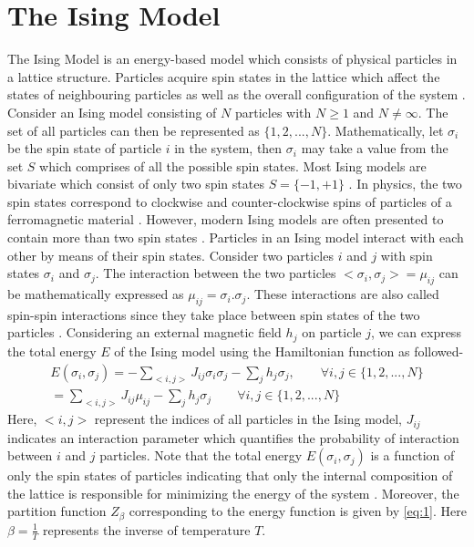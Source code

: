 \documentclass{article}
\begin{document}
\section{The Ising Model}
The Ising Model \cite{intro} is an energy-based model which consists of physical particles in a lattice structure. Particles acquire spin states in the lattice which affect the states of neighbouring particles as well as the overall configuration of the system \cite{spin}. Consider an Ising model consisting of $N$ particles with $N \geq 1$ and $N \neq \infty$. The set of all particles can then be represented as $\{1,2,...,N\}$. Mathematically, let $\sigma_{i}$ be the spin state of particle $i$ in the system, then $\sigma_{i}$ may take a value from the set $S$ which comprises of all the possible spin states. Most Ising models are bivariate which consist of only two spin states $S = \{-1,+1\}$ \cite{scaling}. In physics, the two spin states correspond to clockwise and counter-clockwise spins of particles of a ferromagnetic material \cite{intro}. However, modern Ising models are often presented to contain more than two spin states \cite{ising-energy}. Particles in an Ising model interact with each other by means of their spin states. Consider two particles $i$ and $j$ with spin states $\sigma_{i}$ and $\sigma_{j}$. The interaction between the two particles $<\sigma_{i},\sigma_{j}> = \mu_{ij}$ can be mathematically expressed as $\mu_{ij} = \sigma_{i}.\sigma_{j}$. These interactions are also called spin-spin interactions since they take place between spin states of the two particles \cite{spin}. Considering an external magnetic field $h_{j}$ \cite{field} on particle $j$, we can express the total energy $E$ of the Ising model using the Hamiltonian function \cite{book} as followed-
\begin{gather}
    E(\sigma_{i},\sigma_{j}) = - \sum_{<i,j>} J_{ij}\sigma_{i}\sigma_{j} - \sum_{j}h_{j}\sigma_{j}, \qquad \forall i,j \in \{1,2,...,N\} \nonumber \\
    = \sum_{<i,j>} J_{ij}\mu_{ij} - \sum_{j}h_{j}\sigma_{j} \qquad \forall i,j \in \{1,2,...,N\} \nonumber
\end{gather}
Here, $<i,j>$ represent the indices of all particles in the Ising model, $J_{ij}$ indicates an interaction parameter which quantifies the probability of interaction between $i$ and $j$ particles. Note that the total energy $E(\sigma_{i},\sigma_{j})$ is a function of only the spin states of particles indicating that only the internal composition of the lattice is responsible for minimizing the energy of the system \cite{thompson}. Moreover, the partition function $Z_{\beta}$ \cite{energy} corresponding to the energy function is given by \autoref{eq:1}. Here $\beta = \frac{1}{T}$ represents the inverse of temperature $T$. 
\end{document}
